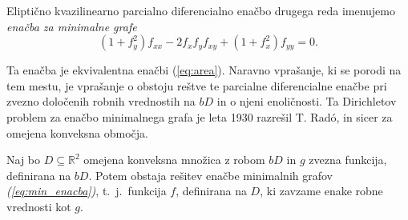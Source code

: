 \documentclass[fin1, tisk, bibtex]{fmfdelo}
\begin{document}
\begin{definicija}
    Eliptično kvazilinearno parcialno diferencialno enačbo drugega reda imenujemo \emph{enačba za minimalne grafe}
    \begin{equation}
        \left(1+f_y^2\right) f_{x x}-2 f_x f_y f_{x y}+\left(1+f_x^2\right) f_{y y}=0. \label{eq:min_enacba}
    \end{equation}
\end{definicija}

Ta enačba je ekvivalentna enačbi (\ref{eq:area}). Naravno vprašanje, ki se porodi na tem mestu, je vprašanje o obstoju reštve te parcialne diferencialne enačbe pri zvezno določenih robnih vrednostih na $bD$ in o njeni enoličnosti. Ta Dirichletov problem za enačbo minimalnega grafa je leta 1930 razrešil T. Radó, in sicer za omejena konveksna območja.

\begin{trditev}
    Naj bo $D \subseteq \mathbb{R}^2$ omejena konveksna množica z robom $bD$ in $g$ zvezna funkcija, definirana na $bD$. Potem obstaja rešitev enačbe minimalnih grafov \emph{(\ref{eq:min_enacba})}, t.~j.~funkcija $f$, definirana na $D$, ki zavzame enake robne vrednosti kot $g$.     
\end{trditev}
\end{document}

